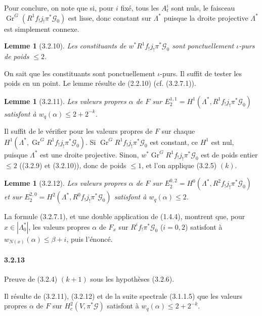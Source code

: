 \documentclass[12pt,a4paper]{article}
\theoremstyle{plain}
\newtheorem{lemma}[theorem]{Lemme}
\theoremstyle{definition}
\theoremstyle{remark}
\DeclareMathOperator{\Gr}{Gr}
\begin{document}
Pour conclure, on note que si, pour $i$ fix\'e, tous les $A_t^i$ sont nuls, le faisceau $\Gr^G(R^1 f_! j_! \pi^* \mathscr{G}_0)$ est lisse, donc constant sur $\Lambda^*$ puisque la droite projective $\Lambda^*$ est simplement connexe.

\begin{lemma}[3.2.10]
Les constituants de $w^* R^1 f_! j_! \pi^* \mathscr{G}_0$ sont ponctuellement $\iota$-purs de poids $\leq 2$.
\end{lemma}

On sait que les constituants sont ponctuellement $\iota$-purs. Il suffit de tester les poids en un point. Le lemme r\'esulte de (2.2.10) (cf. (3.2.7.1)).

\begin{lemma}[3.2.11]
Les valeurs propres $\alpha$ de $F$ sur $E_2^{1,1} = H^1(\Lambda^*, R^1 f_! j_! \pi^* \mathscr{G}_0)$ satisfont \`a $w_q(\alpha) \leq 2 + 2^{-k}$.
\end{lemma}

Il suffit de le v\'erifier pour les valeurs propres de $F$ sur chaque $H^1(\Lambda^*, \Gr^G R^1 f_! j_! \pi^* \mathscr{G}_0)$. Si $\Gr^G R^1 f_! j_! \pi^* \mathscr{G}_0$ est constant, ce $H^1$ est nul, puisque $\Lambda^*$ est une droite projective. Sinon, $w^* \Gr^G R^1 f_! j_! \pi^* \mathscr{G}_0$ est de poids entier $\leq 2$ ((3.2.9) et (3.2.10)), donc de poids $\leq 1$, et l'on applique (3.2.5) $(k)$.

\begin{lemma}[3.2.12]
Les valeurs propres $\alpha$ de $F$ sur $E_2^{0,2} = H^0(\Lambda^*, R^2 f_! j_! \pi^* \mathscr{G}_0)$ et sur $E_2^{2,0} = H^2(\Lambda^*, R^0 f_! j_! \pi^* \mathscr{G}_0)$ satisfont \`a $w_q(\alpha) \leq 2$.
\end{lemma}

La formule (3.2.7.1), et une double application de (1.4.4), montrent que, pour $x \in |\Lambda_0^*|$, les valeurs propres $\alpha$ de $F_x$ sur $R^i f_! \pi^* \mathscr{G}_0$ ($i = 0, 2$) satisfont \`a $w_{N(x)}(\alpha) \leq \beta + i$, puis l'\'enonc\'e.

\paragraph{3.2.13}
Preuve de (3.2.4) $(k+1)$ sous les hypoth\`eses (3.2.6).


Il r\'esulte de (3.2.11), (3.2.12) et de la suite spectrale (3.1.1.5) que les valeurs propres $\alpha$ de $F$ sur $H_c^2(V, \pi^*\mathscr{G})$ satisfont \`a $w_q(\alpha) \leq 2 + 2^{-k}$.
\end{document}
